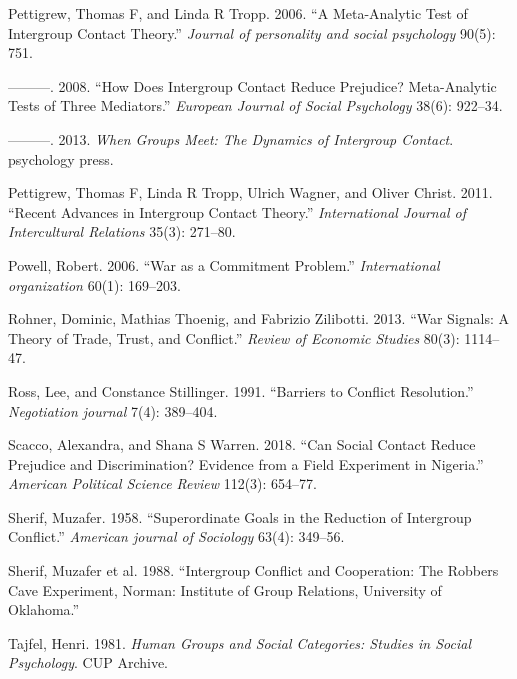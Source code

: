 \documentclass[11pt]{article}
\begin{document}
\leavevmode\hypertarget{ref-pettigrew2006meta}{}%
Pettigrew, Thomas F, and Linda R Tropp. 2006. ``A Meta-Analytic Test of
Intergroup Contact Theory.'' \emph{Journal of personality and social
psychology} 90(5): 751.

\leavevmode\hypertarget{ref-pettigrew2008does}{}%
---------. 2008. ``How Does Intergroup Contact Reduce Prejudice?
Meta-Analytic Tests of Three Mediators.'' \emph{European Journal of
Social Psychology} 38(6): 922--34.

\leavevmode\hypertarget{ref-pettigrew2013groups}{}%
---------. 2013. \emph{When Groups Meet: The Dynamics of Intergroup
Contact}. psychology press.

\leavevmode\hypertarget{ref-pettigrew2011advances}{}%
Pettigrew, Thomas F, Linda R Tropp, Ulrich Wagner, and Oliver Christ.
2011. ``Recent Advances in Intergroup Contact Theory.''
\emph{International Journal of Intercultural Relations} 35(3): 271--80.

\leavevmode\hypertarget{ref-powell2006war}{}%
Powell, Robert. 2006. ``War as a Commitment Problem.''
\emph{International organization} 60(1): 169--203.

\leavevmode\hypertarget{ref-rohner2013war}{}%
Rohner, Dominic, Mathias Thoenig, and Fabrizio Zilibotti. 2013. ``War
Signals: A Theory of Trade, Trust, and Conflict.'' \emph{Review of
Economic Studies} 80(3): 1114--47.

\leavevmode\hypertarget{ref-ross1991barriers}{}%
Ross, Lee, and Constance Stillinger. 1991. ``Barriers to Conflict
Resolution.'' \emph{Negotiation journal} 7(4): 389--404.

\leavevmode\hypertarget{ref-scacco2018nigeria}{}%
Scacco, Alexandra, and Shana S Warren. 2018. ``Can Social Contact Reduce
Prejudice and Discrimination? Evidence from a Field Experiment in
Nigeria.'' \emph{American Political Science Review} 112(3): 654--77.

\leavevmode\hypertarget{ref-sherif1958superordinate}{}%
Sherif, Muzafer. 1958. ``Superordinate Goals in the Reduction of
Intergroup Conflict.'' \emph{American journal of Sociology} 63(4):
349--56.

\leavevmode\hypertarget{ref-Sherif1988robbersCave}{}%
Sherif, Muzafer et al. 1988. ``Intergroup Conflict and Cooperation: The
Robbers Cave Experiment, Norman: Institute of Group Relations,
University of Oklahoma.''

\leavevmode\hypertarget{ref-tajfel1981groups}{}%
Tajfel, Henri. 1981. \emph{Human Groups and Social Categories: Studies
in Social Psychology}. CUP Archive.
\end{document}
